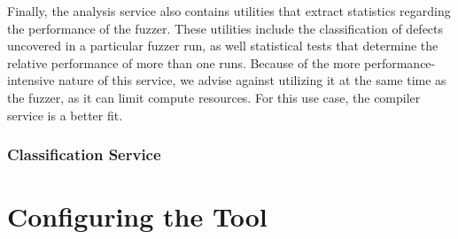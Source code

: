 Finally, the analysis service also contains utilities that
extract statistics regarding the performance of the fuzzer.
These utilities include the classification of defects uncovered
in a particular fuzzer run, as well statistical tests
that determine the relative performance of more than one runs.
Because of the more performance-intensive nature of this
service, we advise against utilizing it at the same time
as the fuzzer, as it can limit compute resources.
For this use case, the compiler service is a better fit.

\subsubsection{Classification Service}

\section{\label{sec:configuration}Configuring the Tool}
